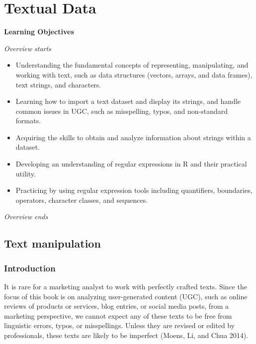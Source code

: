 
\chapter{Textual Data}\label{sec-textual-data}

\textbf{Learning Objectives}

\emph{Overview starts}

\begin{itemize}
\tightlist
\item
  Understanding the fundamental concepts of representing, manipulating, and
  working with text, such as data structures (vectors, arrays, and data
  frames), text strings, and characters.
\item
  Learning how to import a text dataset and display its strings, and handle
  common issues in UGC, such as misspelling, typos, and non-standard
  formats.
\item
  Acquiring the skills to obtain and analyze information about strings within
  a dataset.
\item
  Developing an understanding of regular expressions in R and their
  practical utility.
\item
  Practicing by using regular expression tools including quantifiers,
  boundaries, operators, character classes, and sequences.
\end{itemize}

\emph{Overview ends}

\section{Text manipulation}\label{text-manipulation}

\subsection{Introduction}\label{introduction}

It is rare for a marketing analyst to work with perfectly crafted texts.
Since the focus of this book is on analyzing user-generated content
(UGC), such as online reviews of products or services, blog entries, or
social media posts, from a marketing perspective, we cannot expect any of
these texts to be free from linguistic errors, typos, or misspellings.
Unless they are revised or edited by professionals, these texts are
likely to be imperfect (Moens, Li, and Chua 2014).

